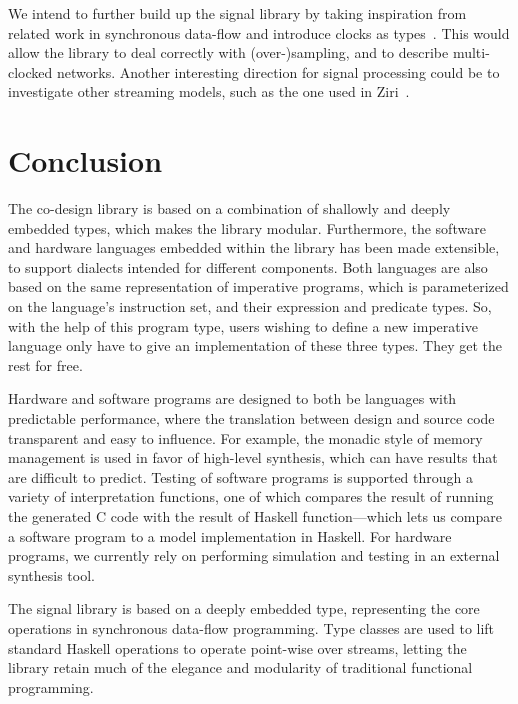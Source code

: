 \documentclass[../main.tex]{subfiles}
\begin{document}
We intend to further build up the signal library by taking inspiration from related work in synchronous data-flow and introduce clocks as types~\cite{lucy2008}. This would allow the library to deal correctly with (over-)sampling, and to describe multi-clocked networks. Another interesting direction for signal processing could be to investigate other streaming models, such as the one used in Ziri~\cite{ziria2015, fudgets1993}.

\section{Conclusion}
\label{conc}

The co-design library is based on a combination of shallowly and deeply embedded types, which makes the library modular. Furthermore, the software and hardware languages embedded within the library has been made extensible, to support dialects intended for different components. Both languages are also based on the same representation of imperative programs, which is parameterized on the language's instruction set, and their expression and predicate types. So, with the help of this program type, users wishing to define a new imperative language only have to give an implementation of these three types. They get the rest for free.

Hardware and software programs are designed to both be languages with predictable performance, where the translation between design and source code transparent and easy to influence. For example, the monadic style of memory management is used in favor of high-level synthesis, which can have results that are difficult to predict. Testing of software programs is supported through a variety of interpretation functions, one of which compares the result of running the generated C code with the result of Haskell function---which lets us compare a software program to a model implementation in Haskell. For hardware programs, we currently rely on performing simulation and testing in an external synthesis tool.

The signal library is based on a deeply embedded type, representing the core operations in synchronous data-flow programming. Type classes are used to lift standard Haskell operations to operate point-wise over streams, letting the library retain much of the elegance and modularity of traditional functional programming.
\end{document}
